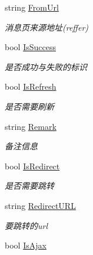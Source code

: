 \begin{DoxyCompactItemize}
string \hyperlink{class_json_msg_head_a54e392cc544783fd8f6eff683837efeb}{From\-Url}
\begin{DoxyCompactList}\small\item\em 消息页来源地址(reffer) \end{DoxyCompactList}\item 
bool \hyperlink{class_json_msg_head_ae469a6cdc43ba8a305f1ea0f738fefb2}{Is\-Success}
\begin{DoxyCompactList}\small\item\em 是否成功与失败的标识 \end{DoxyCompactList}\item 
bool \hyperlink{class_json_msg_head_a2f7ab4b4950d59559dc61dbe85ab6e83}{Is\-Refresh}
\begin{DoxyCompactList}\small\item\em 是否需要刷新 \end{DoxyCompactList}\item 
string \hyperlink{class_json_msg_head_ad1b553e80f96e9a7bb417db79179b2b1}{Remark}
\begin{DoxyCompactList}\small\item\em 备注信息 \end{DoxyCompactList}\item 
bool \hyperlink{class_json_msg_head_a6be740681187896f1f1924cc07ca544e}{Is\-Redirect}
\begin{DoxyCompactList}\small\item\em 是否需要跳转 \end{DoxyCompactList}\item 
string \hyperlink{class_json_msg_head_ab6ddde17d5cbb264e0641b09f19e9c22}{Redirect\-U\-R\-L}
\begin{DoxyCompactList}\small\item\em 要跳转的url \end{DoxyCompactList}\item 
bool \hyperlink{class_json_msg_head_abdfd31cd1c4bcbca50b1afc5e57c95d8}{Is\-Ajax}

\end{DoxyCompactItemize}
